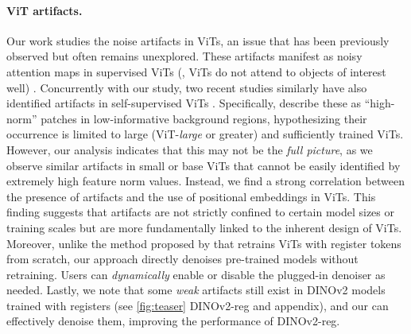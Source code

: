 \paragraph{ViT artifacts.} Our work studies the noise artifacts in ViTs, an issue that has been previously observed but often remains unexplored. These artifacts manifest as noisy attention maps in supervised ViTs (\ie, ViTs do not attend to objects of interest well) \cite{caron2021emerging,chen2021vision}. Concurrently with our study, two recent studies similarly have also identified artifacts in self-supervised ViTs \cite{yang2023emernerf,darcet2023vision}. Specifically, \cite{darcet2023vision} describe these as ``high-norm'' patches in low-informative background regions, hypothesizing their occurrence is limited to large (\eg ViT-\textit{large} or greater) and sufficiently trained ViTs. However, our analysis indicates that this may not be the \textit{full picture}, as we observe similar artifacts in small or base ViTs that cannot be easily identified by extremely high feature norm values. Instead, we find a strong correlation between the presence of artifacts and the use of positional embeddings in ViTs. This finding suggests that artifacts are not strictly confined to certain model sizes or training scales but are more fundamentally linked to the inherent design of ViTs.
Moreover, unlike the method proposed by \cite{darcet2023vision} that retrains ViTs with register tokens \cite{goyal2023think, xiao2023efficient} from scratch,
our approach directly denoises pre-trained models without retraining. Users can \textit{dynamically} enable or disable the plugged-in denoiser as needed. Lastly, we note that some \textit{weak} artifacts still exist in DINOv2 models trained with registers \cite{darcet2023vision} (see \cref{fig:teaser} DINOv2-reg and appendix), and our \ours can effectively denoise them, improving the performance of DINOv2-reg.

